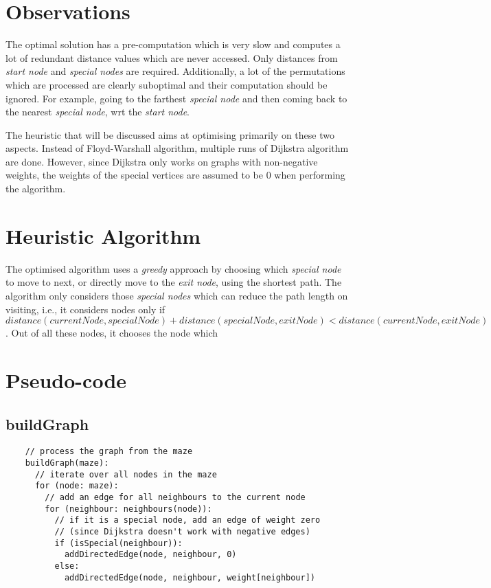 \documentclass[12pt]{report}
\begin{document}
\section{Observations}
The optimal solution has a pre-computation which is very slow and computes a lot of redundant distance values which are never accessed. Only distances from \textit{start node} and \textit{special nodes} are required. Additionally, a lot of the permutations which are processed are clearly suboptimal and their computation should be ignored. For example, going to the farthest \textit{special node} and then coming back to the nearest \textit{special node}, wrt the \textit{start node}.\par
The heuristic that will be discussed aims at optimising primarily on these two aspects. Instead of Floyd-Warshall algorithm, multiple runs of Dijkstra algorithm are done. However, since Dijkstra only works on graphs with non-negative weights, the weights of the special vertices are assumed to be $0$ when performing the algorithm.

\section{Heuristic Algorithm} %
The optimised algorithm uses a \textit{greedy} approach by choosing which \textit{special node} to move to next, or directly move to the \textit{exit node}, using the shortest path. The algorithm only considers those \textit{special nodes} which can reduce the path length on visiting, i.e., it considers nodes only if ${distance}({currentNode}, {specialNode}) + {distance}({specialNode}, {exitNode}) < {distance}({currentNode}, {exitNode})$. Out of all these nodes, it chooses the node which %

\section{Pseudo-code}
\subsection{buildGraph}
\begin{tcolorbox}
\begin{verbatim}
    // process the graph from the maze
    buildGraph(maze):
      // iterate over all nodes in the maze
      for (node: maze):
        // add an edge for all neighbours to the current node
        for (neighbour: neighbours(node)):
          // if it is a special node, add an edge of weight zero
          // (since Dijkstra doesn't work with negative edges)
          if (isSpecial(neighbour)):
            addDirectedEdge(node, neighbour, 0)
          else:
            addDirectedEdge(node, neighbour, weight[neighbour])
\end{verbatim}
\end{tcolorbox}
\end{document}
